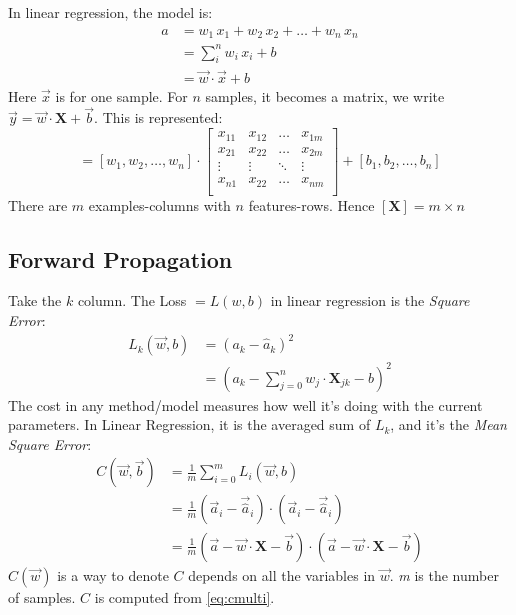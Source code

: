 In linear regression, the model is:
\begin{align*}
 a &= w_1\, x_1 + w_2\, x_2 +\ldots+ w_n\, x_n\\
   &= \sum_i^n w_i\, x_i + b \\
   &= \vec{w}\cdot\vec{x} + b
\end{align*}
Here $\vec{x}$ is for one sample. For $n$ samples, it becomes a matrix, we write $\vec{y} = \vec{w}\cdot\mathbf{X} + \vec{b}$. This is represented:
\begin{equation*}
  [a_1, a_2, \ldots, a_n] = 
  [w_1, w_2, \ldots, w_n] \cdot
  \begin{bmatrix}
    x_{11} & x_{12} & \ldots & x_{1m}\\
    x_{21} & x_{22} & \ldots & x_{2m}\\
    \vdots & \vdots & \ddots & \vdots\\
    x_{n1} & x_{22} & \ldots & x_{nm}\\
  \end{bmatrix}
  + [b_1, b_2, \ldots, b_n]
\end{equation*}
There are $m$ examples-columns with $n$ features-rows. Hence $[\mathbf{X}] = m\times{}n$

\subsection{Forward Propagation}
Take the $k$ column. The Loss $= L(w,b)$ in linear regression is the \textit{Square Error}:
\begin{align*}
  L_k(\vec{w},b) &= (a_k - \hat{a}_k)^2\\
  &= (a_k - \sum_{j=0}^n w_j\cdot{}{\mathbf{X}}_{jk} - b)^2
\end{align*}
The cost in any method/model measures how well it's doing with the current parameters. In Linear Regression, it is the averaged sum of $L_k$, and it's the \textit{Mean Square Error}:
\begin{align}
  C(\vec{w}, \vec{b}) &= \frac{1}{m}\sum_{i=0}^m L_i(\vec{w}, b)\nonumber\\
  &=\frac{1}{m}(\vec{a}_i - \vec{\hat{a}}_i)\cdot{}(\vec{a}_i - \vec{\hat{a}}_i)\nonumber\\
  &= \frac{1}{m} (\vec{a} - \vec{w}\cdot{}\mathbf{X} - \vec{b})\cdot{}(\vec{a} - \vec{w}\cdot{}\mathbf{X} - \vec{b}) \label{eq:cmulti}
\end{align}
$C(\vec{w})$ is a way to denote $C$ depends on all the variables in $\vec{w}$. \textit{m} is the number of samples. $C$ is computed from \ref{eq:cmulti}.

